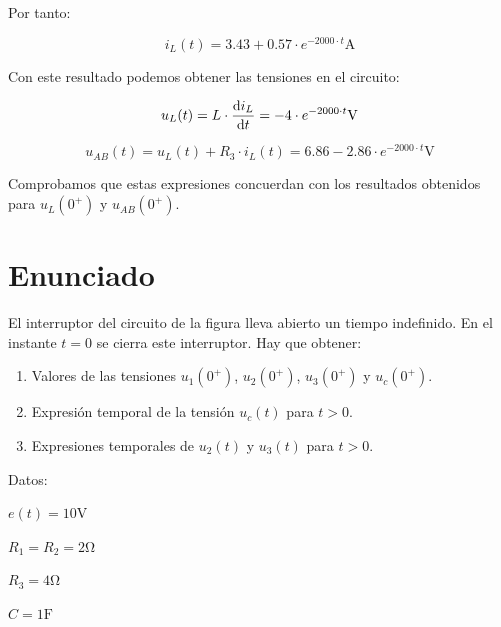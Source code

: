 Por tanto:

\begin{equation*}
  i_L(t) = 3.43 + 0.57 \cdot e^{-2000 \cdot t} \unit{\ampere}
\end{equation*}

Con este resultado podemos obtener las tensiones en el circuito:

\begin{equation*}
  u_L(t) = L \cdot \diff{i_L}{t} = - 4 \cdot e^{-2000 \cdot t} \unit{\volt}
\end{equation*}


\begin{equation*}
  u_{AB}(t) =  u_L(t) + R_3 \cdot i_L(t) = 6.86 - 2.86 \cdot e^{-2000 \cdot t} \unit{\volt}
\end{equation*}

Comprobamos que estas expresiones concuerdan con los resultados
obtenidos para $u_L(0^+)$ y $u_{AB}(0^+)$.

\section{Enunciado}

El interruptor del circuito de la figura lleva abierto un tiempo
indefinido. En el instante $t= 0$ se cierra este interruptor. Hay que
obtener:
\begin{enumerate}
\item Valores de las tensiones $u_1(0^+)$, $u_2(0^+)$, $u_3(0^+)$ y
  $u_c(0^+)$.
\item Expresión temporal de la tensión $u_c(t)$ para $t > 0$.
\item Expresiones temporales de $u_2(t)$ y $u_3(t)$ para $t > 0$.
\end{enumerate}

\begin{minipage}{0.5\linewidth}
\end{minipage}
\begin{minipage}{0.5\linewidth}
  Datos:

  $e(t) = 10\unit{\volt}$
  
  $R_1 = R_2 = 2 \unit{\ohm}$

  $R_3= 4 \unit{\ohm}$

  $C = 1 \unit{\farad}$
\end{minipage}

